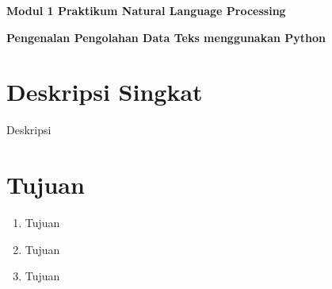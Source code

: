 \documentclass{article}
\begin{document}
    \begin{center}
        \textbf{Modul 1 Praktikum Natural Language Processing}

        \textbf{Pengenalan Pengolahan Data Teks menggunakan Python}
    \end{center}

    \section*{Deskripsi Singkat}
    Deskripsi

    \section*{Tujuan}
    \begin{enumerate}
        \item Tujuan
        \item Tujuan
        \item Tujuan
    \end{enumerate}
\end{document}
